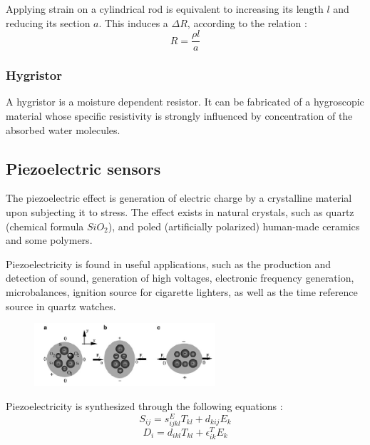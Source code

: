 Applying strain on a cylindrical rod is equivalent to increasing its length $l$ and reducing its section $a$. This induces a $\Delta R$, according to the relation : 
$$R = \frac{\rho l}{a}$$

\subsubsection{Hygristor}

A hygristor is a moisture dependent resistor. It can be fabricated of a hygroscopic material whose
specific resistivity is strongly influenced by concentration of the absorbed water
molecules.

\subsection{Piezoelectric sensors}

The piezoelectric effect is generation of electric charge by a crystalline material
upon subjecting it to stress. The effect exists in natural crystals, such as quartz
(chemical formula $SiO_2$), and poled (artificially polarized) human-made ceramics
and some polymers.

Piezoelectricity is found in useful applications, such as the production and detection of sound, generation of high voltages, electronic frequency generation, microbalances, ignition source for cigarette lighters, as well as the time reference source in quartz watches. 

\begin{figure}[H]
    \centering
    \includegraphics[width = 0.6\textwidth]{L2/img/piezo.PNG}
\end{figure}

Piezoelectricity is synthesized through the following equations : 
$$S_{ij} = s_{ijkl}^E T_{kl} + d_{kij} E_k$$
$$D_i = d_{ikl} T_{kl} + \epsilon_{ik}^T E_{k}$$

